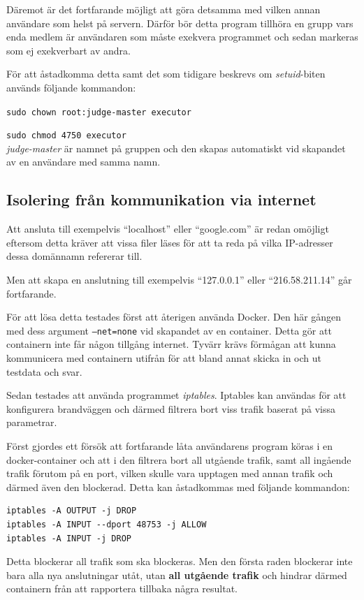 \documentclass{article}
\begin{document}
Däremot är det fortfarande möjligt att göra detsamma med vilken annan användare
som helst på servern. Därför bör detta program tillhöra en grupp vars enda
medlem är användaren som måste exekvera programmet och sedan markeras som ej
exekverbart av andra.

För att åstadkomma detta samt det som tidigare beskrevs om \textit{setuid}-biten
används följande kommandon:

\texttt{sudo chown root:judge-master executor}

\texttt{sudo chmod 4750 executor}
\\
\textit{judge-master} är namnet på gruppen och den skapas automatiskt vid
skapandet av en användare med samma namn.

\subsection{Isolering från kommunikation via internet}

Att ansluta till exempelvis ``localhost'' eller ``google.com'' är redan omöjligt
eftersom detta kräver att vissa filer läses för att ta reda på vilka IP-adresser
dessa domännamn refererar till.

Men att skapa en anslutning till exempelvis ``127.0.0.1'' eller
``216.58.211.14'' går fortfarande.

För att lösa detta testades först att återigen använda Docker. Den här gången
med dess argument \texttt{--net=none} vid skapandet av en container. Detta gör
att containern inte får någon tillgång internet. Tyvärr krävs förmågan att kunna
kommunicera med containern utifrån för att bland annat skicka in och ut testdata
och svar.

Sedan testades att använda programmet \textit{iptables}. Iptables kan användas
för att konfigurera brandväggen och därmed filtrera bort viss trafik baserat på
vissa parametrar.

Först gjordes ett försök att fortfarande låta användarens program köras i en
docker-container och att i den filtrera bort all utgående trafik, samt all
ingående trafik förutom på en port, vilken skulle vara upptagen med annan
trafik och därmed även den blockerad. Detta kan åstadkommas med följande
kommandon:

\begin{verbatim}
iptables -A OUTPUT -j DROP
iptables -A INPUT --dport 48753 -j ALLOW
iptables -A INPUT -j DROP
\end{verbatim}

Detta blockerar all trafik som ska blockeras. Men den första raden blockerar
inte bara alla nya anslutningar utåt, utan \textbf{all utgående trafik} och
hindrar därmed containern från att rapportera tillbaka några resultat.
\end{document}
